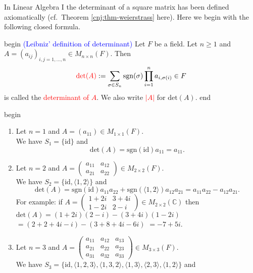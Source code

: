 \documentclass[
  12pt,
  a4paper,
  twoside]{article}
\providecommand{\tightlist}{%
  \setlength{\itemsep}{0pt}\setlength{\parskip}{0pt}}
\theoremstyle{plain}
\theoremstyle{definition}
\begin{document}
In Linear Algebra I the determinant of a square matrix has been defined axiomatically (cf.~Theorem \ref{cnj:thm-weierstrass} here). Here we begin with the following closed formula.

\csname begin\label{cnj:defn-leibniz}
\textcolor{blue}{(Leibniz' definition of determinant)}
Let \(F\) be a field. Let \(n \geq 1\) and \(A = (a_{ij})_{i,j=1, \dots,n} \in M_{n \times n}(F)\). Then
\[
{\color{red}{\mathrm{det}(A)}} := \sum_{\sigma \in S_{n}} \mathrm{sgn}(\sigma) \prod_{i=1}^{n} a_{i, \sigma(i)} \in F
\]
is called the \textcolor{red}{determinant of $A$}. We also write \textcolor{red}{$|A|$} for \(\mathrm{det}(A)\).
\csname end

\csname begin\label{cnj:expl-det}

\begin{enumerate}
\def\labelenumi{(\alph{enumi})}
\tightlist
\item
  Let \(n=1\) and \(A=(a_{11}) \in M_{1 \times 1}(F)\).\\
  We have \(S_{1} = \{ \mathrm{id} \}\) and
  \[
  \mathrm{det}(A) = \mathrm{sgn}(\mathrm{id}) a_{11} = a_{11}.
  \]
\item
  Let \(n=2\) and \(A = \begin{pmatrix} a_{11} & a_{12} \\ a_{21} & a_{22} \end{pmatrix} \in M_{2 \times 2}(F)\).\\
  We have \(S_{2} = \{\mathrm{id}, \langle 1, 2 \rangle \}\) and
  \[
  \mathrm{det}(A) = \mathrm{sgn}(\mathrm{id}) a_{11} a_{22} + \mathrm{sgn}(\langle 1,2 \rangle) a_{12} a_{21} = a_{11} a_{22} - a_{12} a_{21}.
  \]
  For example: if \(A = \begin{pmatrix} 1+2i & 3 +4i \\ 1-2i & 2-i \end{pmatrix} \in M_{2 \times 2}(\mathbb{C})\) then\\
  \(\mathrm{det}(A) = (1 + 2i)(2 - i) - (3+4i)(1-2i)\)
  \(= (2 + 2 + 4i - i) - (3 + 8 + 4i - 6i)\)
  \(= -7 + 5i\).
\item
  Let \(n=3\) and \(A = \begin{pmatrix} a_{11} & a_{12} & a_{13} \\ a_{21} & a_{22} & a_{23} \\ a_{31} & a_{32} & a_{33} \end{pmatrix} \in M_{3 \times 3}(F)\).\\
  We have \(S_{3} = \{\mathrm{id}, \langle 1,2,3 \rangle, \langle 1,3,2 \rangle, \langle 1,3 \rangle, \langle 2,3 \rangle, \langle 1,2 \rangle \}\) and

\end{enumerate}
\end{document}

